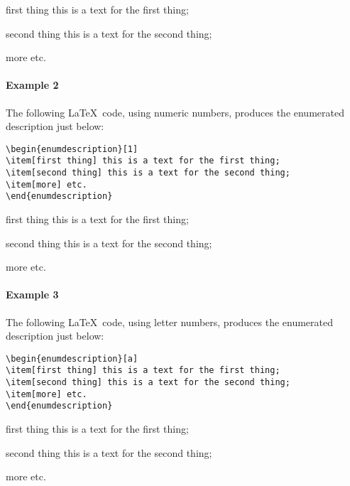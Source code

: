 \documentclass[book,taskpackage,specpackage,codepackage]{upmethodology-document}
\begin{document}
\begin{enumdescription}
\item[first thing] this is a text for the first thing;
\item[second thing] this is a text for the second thing;
\item[more] etc.
\end{enumdescription}

\paragraph{Example 2} The following \LaTeX~code, using numeric numbers, produces the enumerated description just below:
\begin{verbatim}
\begin{enumdescription}[1]
\item[first thing] this is a text for the first thing;
\item[second thing] this is a text for the second thing;
\item[more] etc.
\end{enumdescription}
\end{verbatim}

\begin{enumdescription}[1]
\item[first thing] this is a text for the first thing;
\item[second thing] this is a text for the second thing;
\item[more] etc.
\end{enumdescription}

\paragraph{Example 3} The following \LaTeX~code, using letter numbers, produces the enumerated description just below:
\begin{verbatim}
\begin{enumdescription}[a]
\item[first thing] this is a text for the first thing;
\item[second thing] this is a text for the second thing;
\item[more] etc.
\end{enumdescription}
\end{verbatim}

\begin{enumdescription}[a]
\item[first thing] this is a text for the first thing;
\item[second thing] this is a text for the second thing;
\item[more] etc.
\end{enumdescription}
\end{document}
